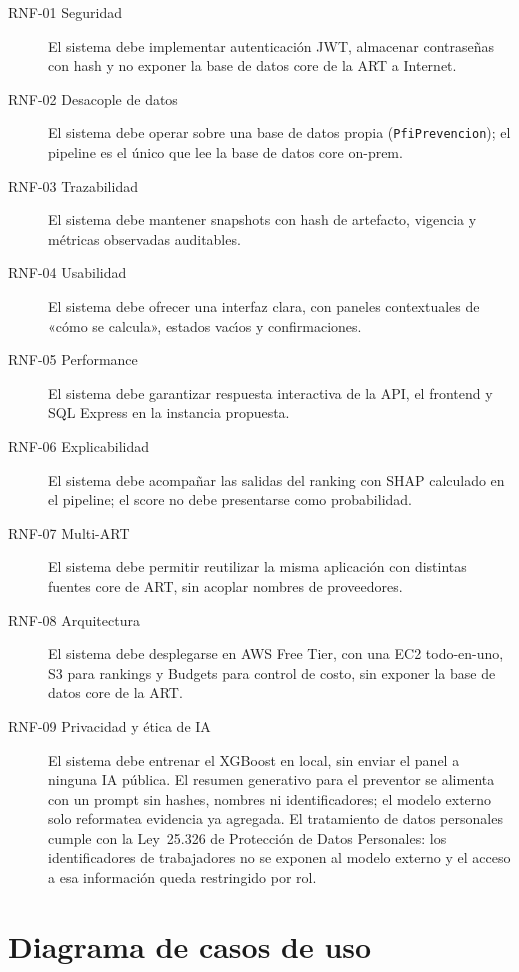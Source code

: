 \begin{description}
	\item[RNF-01 Seguridad] El sistema debe implementar autenticaci\'on JWT, almacenar contrase\~nas con hash y no exponer la base de datos core de la ART a Internet. 
	\item[RNF-02 Desacople de datos] El sistema debe operar sobre una base de datos propia (\texttt{PfiPrevencion}); el pipeline es el \'unico que lee la base de datos core on-prem.
	\item[RNF-03 Trazabilidad] El sistema debe mantener snapshots con hash de artefacto, vigencia y m\'etricas observadas auditables.
	\item[RNF-04 Usabilidad] El sistema debe ofrecer una interfaz clara, con paneles contextuales de «c\'omo se calcula», estados vac\'{\i}os y confirmaciones.
	\item[RNF-05 Performance] El sistema debe garantizar respuesta interactiva de la API, el frontend y SQL Express en la instancia propuesta.
	\item[RNF-06 Explicabilidad] El sistema debe acompa\~nar las salidas del ranking con SHAP calculado en el pipeline; el score no debe presentarse como probabilidad.
	\item[RNF-07 Multi-ART] El sistema debe permitir reutilizar la misma aplicaci\'on con distintas fuentes core de ART, sin acoplar nombres de proveedores.
	\item[RNF-08 Arquitectura] El sistema debe desplegarse en AWS Free Tier, con una EC2 todo-en-uno, S3 para rankings y Budgets para control de costo, sin exponer la base de datos core de la ART.
	\item[RNF-09 Privacidad y \'etica de IA] El sistema debe entrenar el XGBoost en local, sin enviar el panel a ninguna IA p\'ublica. El resumen generativo para el preventor se alimenta con un prompt sin hashes, nombres ni identificadores; el modelo externo solo reformatea evidencia ya agregada. El tratamiento de datos personales cumple con la Ley~25.326 de Protecci\'on de Datos Personales: los identificadores de trabajadores no se exponen al modelo externo y el acceso a esa informaci\'on queda restringido por rol.
\end{description}

\section{Diagrama de casos de uso}

